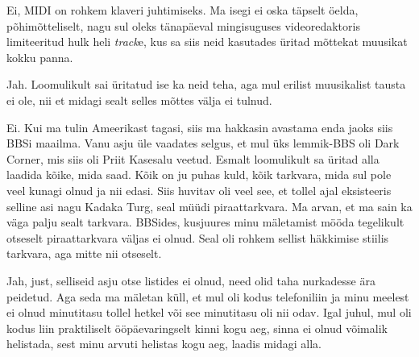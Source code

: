 
Ei, MIDI on rohkem klaveri juhtimiseks. Ma isegi ei oska täpselt öelda, põhimõtteliselt,  nagu sul oleks tänapäeval mingisuguses videoredaktoris limiteeritud hulk heli \emph{track}e, kus sa siis neid kasutades üritad  mõttekat muusikat kokku panna.


Jah. Loomulikult  sai üritatud ise ka neid teha, aga mul erilist muusikalist tausta ei ole, nii et midagi sealt selles mõttes välja ei tulnud.


Ei. Kui ma tulin Ameerikast tagasi, siis ma hakkasin avastama enda jaoks siis BBSi maailma. Vanu asju üle vaadates selgus, et mul üks lemmik-BBS oli Dark Corner, mis siis oli Priit Kasesalu veetud. Esmalt loomulikult sa üritad  alla laadida kõike, mida saad. Kõik on ju puhas kuld, kõik tarkvara, mida sul pole veel kunagi olnud ja nii edasi. Siis huvitav oli veel see, et tollel ajal eksisteeris selline asi nagu Kadaka Turg, seal müüdi piraattarkvara. Ma arvan, et ma sain ka väga palju sealt tarkvara. BBSides, kusjuures minu mäletamist mööda tegelikult otseselt piraattarkvara väljas ei olnud. Seal oli rohkem sellist häkkimise stiilis tarkvara, aga mitte nii otseselt.


Jah, just, selliseid asju otse listides ei olnud, need olid taha nurkadesse ära peidetud. Aga seda ma mäletan küll, et mul oli kodus telefoniliin ja minu meelest ei olnud minutitasu tollel hetkel või see  minutitasu oli nii odav. Igal juhul, mul oli kodus liin praktiliselt ööpäevaringselt kinni kogu aeg, sinna ei olnud võimalik helistada, sest minu arvuti helistas kogu aeg, laadis midagi alla.


